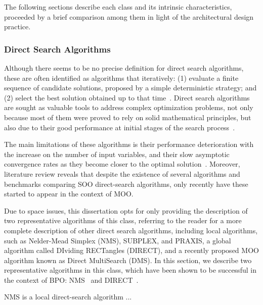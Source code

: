 	The following sections describe each class and its intrinsic characteristics, proceeded by a brief comparison among them in light of the architectural design practice. 	
	
	\subsubsection{Direct Search Algorithms}
	\label{ssec:direct-search}
	
	Although there seems to be no precise definition for direct search algorithms, these are often identified as algorithms that iteratively: (1) evaluate a finite sequence of candidate solutions, proposed by a simple deterministic strategy; and (2) select the best solution obtained up to that time~\cite{Kolda2003,Wortmann2016BBO}. Direct search algorithms are sought as valuable tools to address complex optimization problems, not only because most of them were proved to rely on solid mathematical principles, but also due to their good performance at initial stages of the search process~\cite{Rios2013}. 
	
	The main limitations of these algorithms is their performance deterioration with the increase on the number of input variables, and their slow asymptotic convergence rates as they become closer to the optimal solution~\cite{Kolda2003}. Moreover, literature review reveals that despite the existence of several algorithms and benchmarks comparing \ac{SOO} direct-search algorithms, only recently have these started to appear in the context of \ac{MOO}. 
	
	Due to space issues, this dissertation opts for only providing the description of two representative algorithms of this class, referring  to the reader for a more complete description of other direct search algorithms, including local algorithms, such as Nelder-Mead Simplex (NMS), SUBPLEX, and PRAXIS, a global algorithm called DIviding RECTangles (DIRECT), and a recently proposed \ac{MOO} algorithm known as Direct MultiSearch (DMS). In this section, we describe two representative algorithms in this class, which have been shown to be successful in the context of \ac{BPO}: NMS~\cite{Nelder1964} and DIRECT~\cite{Jones1993DIRECT}. 
	
	NMS is a local direct-search algorithm ...
	
